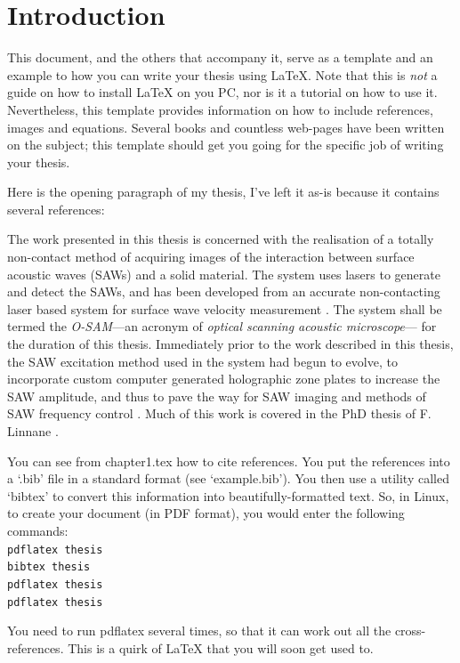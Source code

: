 \chapter{Introduction}
\label{chap:introduction}

This document, and the others that accompany it, serve as a template
and an example to how you can write your thesis using \LaTeX{}. Note that
this is \emph{not} a guide on how to install \LaTeX{} on you PC, nor is
it a tutorial on how to use it. Nevertheless, this template provides
information on how to include references, images and equations. Several
books and countless web-pages have been written on the subject; this 
template should get you going for the specific job of writing your thesis.

Here is the opening paragraph of my thesis, I've left it as-is
because it contains several references:

The work presented in this thesis is concerned with the realisation of a
totally non-contact method of acquiring images of the interaction between
surface acoustic waves (SAWs) and a solid material. The system uses lasers
to generate and detect the SAWs, and has been developed from an accurate
non-contacting laser based system for surface wave velocity measurement
\cite{liu_vel95}. The system shall be termed the \emph{O-SAM}---an acronym
of \emph{optical scanning acoustic microscope}--- for the duration of this
thesis. Immediately prior to the work described in this thesis, the SAW
excitation method used in the system had begun to evolve, to incorporate
custom computer generated holographic zone plates \cite{matt3} to increase
the SAW amplitude, and thus to pave the way for SAW imaging \cite{liu95}
and methods of SAW frequency control \cite{steve1}. Much of this work is
covered in the PhD thesis of F.  Linnane \cite{francis}.

You can see from chapter1.tex how to cite references. You put the
references into a `.bib' file in a standard format (see `example.bib').
You then use a utility called `bibtex' to convert this information into
beautifully-formatted text. So, in Linux, to create your document (in PDF
format), you would enter the following commands: \\
\texttt{pdflatex thesis \\
bibtex thesis \\
pdflatex thesis \\
pdflatex thesis}

You need to run pdflatex several times, so that it can work out all the 
cross-references. This is a quirk of \LaTeX{} that you will soon get used to.

